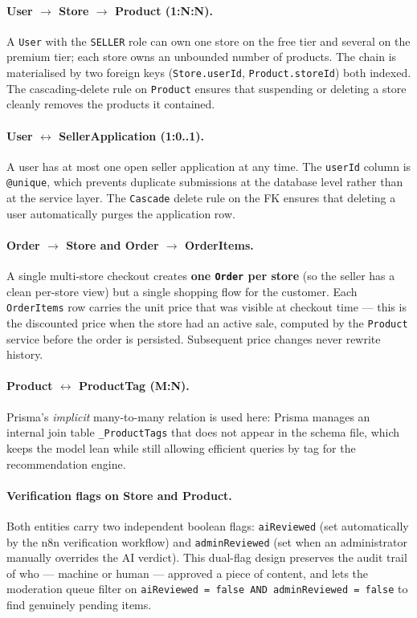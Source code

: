 \documentclass[12pt, a4paper, oneside]{report}
\begin{document}
\paragraph{User $\rightarrow$ Store $\rightarrow$ Product (1:N:N).}
A \texttt{User} with the \texttt{SELLER} role can own one store on
the free tier and several on the premium tier; each store owns an
unbounded number of products. The chain is materialised by two
foreign keys (\texttt{Store.userId}, \texttt{Product.storeId})
both indexed. The cascading-delete rule on \texttt{Product} ensures
that suspending or deleting a store cleanly removes the products it
contained.

\paragraph{User $\leftrightarrow$ SellerApplication (1:0..1).}
A user has at most one open seller application at any time. The
\texttt{userId} column is \texttt{@unique}, which prevents duplicate
submissions at the database level rather than at the service layer.
The \texttt{Cascade} delete rule on the FK ensures that deleting a
user automatically purges the application row.

\paragraph{Order $\rightarrow$ Store and Order $\rightarrow$ OrderItems.}
A single multi-store checkout creates \textbf{one \texttt{Order} per
store} (so the seller has a clean per-store view) but a single
shopping flow for the customer. Each \texttt{OrderItems} row carries
the unit price that was visible at checkout time --- this is the
discounted price when the store had an active sale, computed by the
\texttt{Product} service before the order is persisted. Subsequent
price changes never rewrite history.

\paragraph{Product $\leftrightarrow$ ProductTag (M:N).}
Prisma's \emph{implicit} many-to-many relation is used here: Prisma
manages an internal join table \texttt{\_ProductTags} that does not
appear in the schema file, which keeps the model lean while still
allowing efficient queries by tag for the recommendation engine.

\paragraph{Verification flags on Store and Product.}
Both entities carry two independent boolean flags:
\texttt{aiReviewed} (set automatically by the n8n verification
workflow) and \texttt{adminReviewed} (set when an administrator
manually overrides the AI verdict). This dual-flag design preserves
the audit trail of who --- machine or human --- approved a piece of
content, and lets the moderation queue filter on
\texttt{aiReviewed = false AND adminReviewed = false} to find
genuinely pending items.
\end{document}
